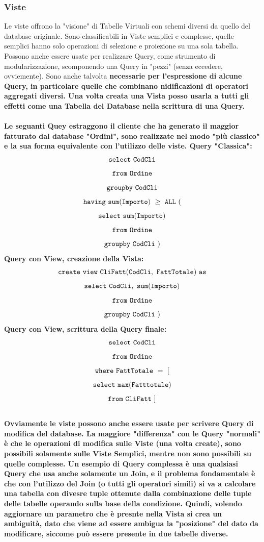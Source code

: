 \documentclass[11pt]{article} %
\begin{document}
\subsubsection{Viste}
Le viste offrono la "visione" di Tabelle Virtuali con schemi diversi da quello del database originale. Sono classificabili in Viste semplici e complesse, quelle semplici hanno solo operazioni di selezione e proiezione su una sola tabella.\\
Possono anche essere usate per realizzare Query, come strumento di modularizzazione, scomponendo una Query in "pezzi" (senza eccedere, ovviemente). Sono anche talvolta \bf necessarie \rm per l'espressione di alcune Query, in particolare quelle che combinano nidificazioni di operatori aggregati diversi. Una volta creata una Vista posso usarla a tutti gli effetti come una Tabella del Database nella scrittura di una Query.\\\\
Le seguanti Quey estraggono il cliente che ha generato il maggior fatturato dal database "Ordini", sono realizzate nel modo "più classico" e la sua forma equivalente con l'utilizzo delle viste.
Query "Classica":
$$\tt select\ CodCli$$
$$\tt from\ Ordine$$
$$\tt group by\ CodCli$$
$$\tt having\ sum(Importo)\ \ge\ ALL\ ($$
$$\tt select\ sum(Importo)$$
$$\tt from\ Ordine$$
$$\tt group by\ CodCli\ )$$
\newpage
Query con View, creazione della Vista:
$$\tt create\ view \ CliFatt(CodCli,\ FattTotale)\ as$$
$$\tt select\ CodCli,\ sum(Importo)$$
$$\tt from\ Ordine$$
$$\tt group by\ CodCli\ )$$
Query con View, scrittura della Query finale:
$$\tt select\ CodCli$$
$$\tt from\ Ordine$$
$$\tt where\ FattTotale\ = \ [ $$
$$\tt select\ max(Fatttotale)$$
$$\tt from\ CliFatt\ ]$$
\\
Ovviamente le viste possono anche essere usate per scrivere Query di modifica del database. La maggiore "differenza" con le Query "normali" è che le operazioni di modifica sulle Viste (una volta create), sono possibili solamente sulle Viste Semplici, mentre non sono possibili su quelle complesse. Un esempio di Query complessa è una qualsiasi Query che usa anche solamente un Join, e il problema fondamentale è che con l'utilizzo del Join (o tutti gli operatori simili) si va a calcolare una tabella con divesre tuple ottenute dalla combinazione delle tuple delle tabelle operando sulla base della condizione. Quindi, volendo aggiornare un parametro che è presnte nella Vista si crea un \bf ambiguità\rm, dato che viene ad essere ambigua la "posizione" del dato da modificare, siccome può essere presente in due tabelle diverse.
\end{document}
